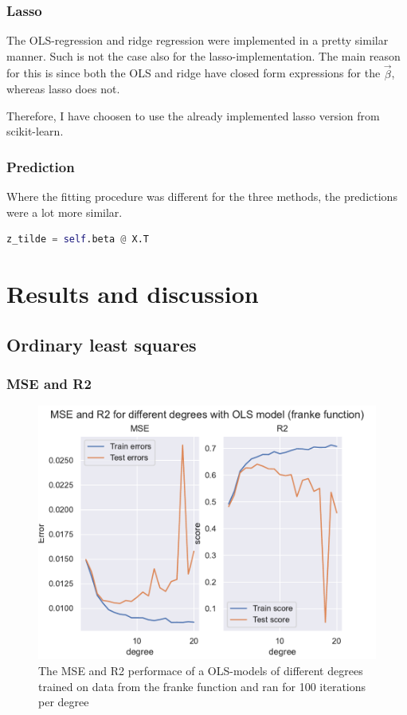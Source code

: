 \documentclass[12pt]{article}
\newcommand{\bbeta}{\vec{\beta}}
\begin{document}
\subsubsection{Lasso}

The OLS-regression and ridge regression were implemented in a pretty similar manner.
Such is not the case also for the lasso-implementation.
The main reason for this is since both the OLS and ridge have closed form expressions for the $\bbeta$, whereas lasso does not.

Therefore, I have choosen to use the already implemented lasso version from scikit-learn.

\subsubsection{Prediction}

Where the fitting procedure was different for the three methods, the predictions were a lot more similar.

\begin{lstlisting}[language=python]
z_tilde = self.beta @ X.T
\end{lstlisting}

\section{Results and discussion}

\subsection{Ordinary least squares}

\subsubsection{MSE and R2}

\begin{figure}[H]
    \centering
    \includegraphics[width=0.8\columnwidth]{../src/output/ols_mse_r2_franke_function.pdf}
    \caption{The MSE and R2 performace of a OLS-models of different degrees trained on data from the franke function and ran for 100 iterations per degree}
    \label{fig:ols_mse_r2_franke}
\end{figure}
\end{document}
